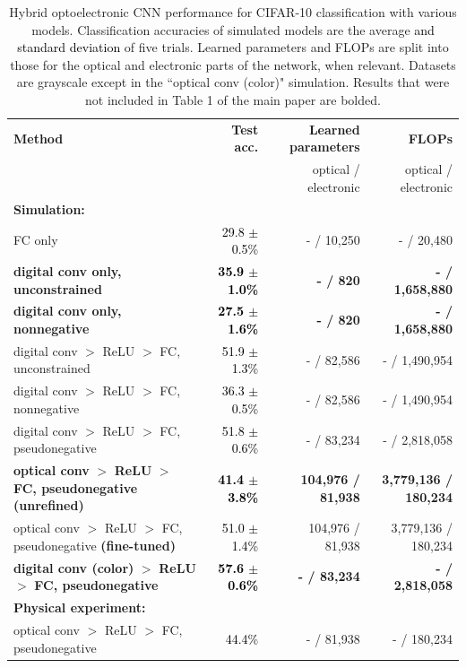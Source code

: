 \documentclass[fleqn,10pt]{wlscirepsupp}
\newcommand{\note}[1]{\textcolor{black}{#1}}
\begin{document}
\setlength{\tabcolsep}{4pt}
\begin{table}
\begin{center}
\caption{Hybrid optoelectronic CNN performance for CIFAR-10 classification with various models. Classification accuracies of simulated models are the average \note{and standard deviation} of five trials. Learned parameters and FLOPs are split into those for the optical and electronic parts of the network, when relevant. Datasets are grayscale except in the ``optical conv (color)" simulation. Results that were not included in Table 1 of the main paper are bolded.}

\label{table:hybrid}
\begin{tabular}{| l | r | r  | r |} \hline 
 \textbf{Method} &  \textbf{Test acc.}  & \textbf{Learned parameters} &  \textbf{\quad \quad FLOPs } \\ 
 &  & optical / electronic & optical / electronic \\
\hline \hline
\textbf{Simulation: } & & &  \\
\quad FC only			& \note{29.8 $\pm$ 0.5\%}	& - / 10,250 & - / 20,480 \\

\textbf{\quad digital conv only, unconstrained}				& \note{\textbf{35.9 $\pm$ 1.0\%}	} & \textbf{- / 820} & \textbf{- / 1,658,880} \\

\quad \textbf{digital conv only, nonnegative}				& \note{\textbf{27.5 $\pm$ 1.6\%}	}& \textbf{- / 820} & \textbf{- / 1,658,880} \\ 

\quad digital conv $>$ ReLU $>$ FC, unconstrained 	&  \note{51.9 $\pm$ 1.3\%}	& - / 82,586 & - / 1,490,954 \\
\quad digital conv $>$ ReLU $>$ FC, nonnegative	 &  \note{36.3 $\pm$ 0.5\%}	 & - / 82,586 & - / 1,490,954 \\
\quad digital conv $>$ ReLU $>$ FC, pseudonegative & \note{51.8 $\pm$ 0.6\%}	& - / 83,234 & - / 2,818,058 \\

\quad \textbf{optical conv} $\bm{>}$ \textbf{ReLU} $\bm{>}$ \textbf{FC, pseudonegative (unrefined)} & \note{\textbf{41.4 $\pm$ 3.8\%}} & \textbf{104,976 / 81,938} & \textbf{3,779,136 / 180,234}	\\

\quad optical conv $>$ ReLU $>$ FC, pseudonegative \textbf{(fine-tuned)} 	&  \note{51.0 $\pm$ 1.4\%}	& 104,976 / 81,938 & 3,779,136 / 180,234\\ 

\quad \textbf{digital conv (color)} $\bm{>}$ \textbf{ReLU} $\bm{>}$\textbf{ FC, pseudonegative} & \note{\textbf{57.6 $\pm$ 0.6\%}}  & \textbf{- / 83,234} & \textbf{- / 2,818,058} \\

\hline
\textbf{Physical experiment: } & & & \\ 
\quad optical conv $>$ ReLU $>$ FC, pseudonegative & \note{44.4\%} &  - / 81,938 & - / 180,234\\
\hline
\end{tabular}
\end{center}
\end{table}
\end{document}
